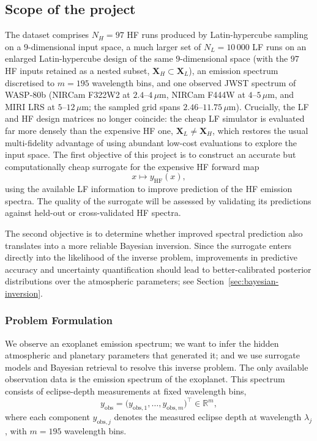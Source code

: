 \documentclass[11pt,a4paper]{article}
\begin{document}
\subsection{Scope of the project}

The dataset comprises $N_{H}=97$ HF runs produced by Latin-hypercube sampling on a $9$-dimensional input space, a much larger set of $N_{L}=10\,000$ LF runs on an enlarged Latin-hypercube design of the same $9$-dimensional space (with the $97$ HF inputs retained as a nested subset, $\bm{X}_{H}\subset\bm{X}_{L}$), an emission spectrum discretised to $m=195$ wavelength bins, and one observed JWST spectrum of WASP-80b
(NIRCam F322W2 at $2.4$--$4\,\mu$m, NIRCam F444W at $4$--$5\,\mu$m, and MIRI LRS at $5$--$12\,\mu$m; the sampled grid spans $2.46$--$11.75\,\mu$m). Crucially, the LF and HF design matrices no longer coincide: the cheap LF simulator is evaluated far more densely than the expensive HF one, $\bm{X}_{L}\neq\bm{X}_{H}$, which restores the usual multi-fidelity advantage of using abundant low-cost evaluations to explore the input space. The first objective of this project is to construct an accurate but
computationally cheap surrogate for the expensive HF forward map
\[
x \longmapsto y_{\mathrm{HF}}(x),
\]
using the available LF information to improve prediction of the HF
emission spectra. The quality of the surrogate will be assessed by
validating its predictions against held-out or cross-validated HF
spectra.

The second objective is to determine whether improved spectral
prediction also translates into a more reliable Bayesian inversion.
Since the surrogate enters directly into the likelihood of the inverse
problem, improvements in predictive accuracy and uncertainty
quantification should lead to better-calibrated posterior distributions
over the atmospheric parameters; see
Section~\ref{sec:bayesian-inversion}.



\subsubsection*{Problem Formulation}

We observe an exoplanet emission spectrum; we want to infer the hidden atmospheric and planetary parameters that generated it; and we use surrogate models and Bayesian retrieval to resolve this inverse problem.
The only available observation data is the emission spectrum of the exoplanet. This spectrum consists of eclipse-depth measurements at fixed wavelength bins,
\[
y_{\mathrm{obs}}
=
\bigl(y_{\mathrm{obs},1},\ldots,y_{\mathrm{obs},m}\bigr)^\top
\in \mathbb{R}^m,
\]
where each component \(y_{\mathrm{obs},j}\) denotes the measured eclipse depth at wavelength \(\lambda_j\), with \(m=195\) wavelength bins.
\end{document}
